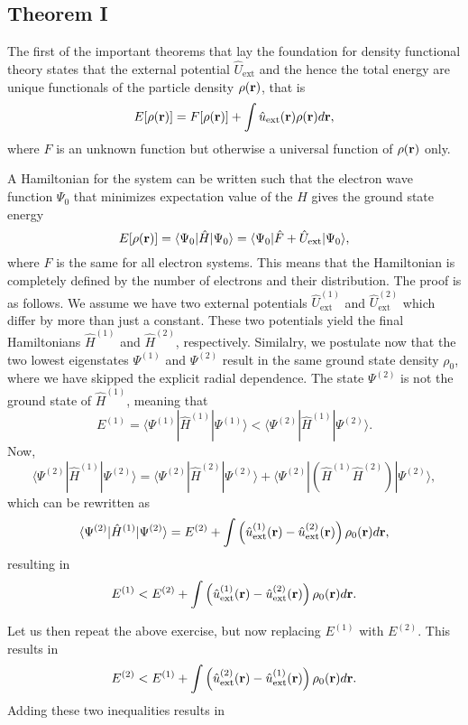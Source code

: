 \subsection{Theorem I}
The first of the important theorems that lay the foundation for density functional theory states that the external
potential $\hat{U}_{\mathrm{ext}}$ and the hence the total energy are unique functionals of the particle density
$\rho({\bf r})$, that is
\[
E[\rho({\bf r})]= F[\rho({\bf r})] +\int \hat{u}_{\mathrm{ext}}({\bf r})\rho({\bf r})d{\bf r},
\] 
where $F$ is an unknown function but otherwise a universal function of $\rho({\bf r})$ only. 

A Hamiltonian for the system can be written such that the electron wave function $\Psi_0$ that minimizes  expectation
value of the $\hat{H}$ gives the ground state energy
\[
E[\rho({\bf r})] = \langle \Psi_0 | \hat{H} |\Psi_0 \rangle=\langle \Psi_0 | \hat{F}+\hat{U}_{\mathrm{ext}} |\Psi_0 \rangle,
\]
where $F$ is the same for all electron systems. This means that the Hamiltonian is completely 
defined by the number of electrons and their distribution. The proof is as follows. We assume we have two
external potentials  $\hat{U}^{(1)}_{\mathrm{ext}}$ and $\hat{U}^{(2)}_{\mathrm{ext}}$ which differ by more than just a constant.
These two potentials yield the final Hamiltonians 
$\hat{H}^{(1)}$ and $\hat{H}^{(2)}$, respectively. Similalry, we postulate now that the two lowest eigenstates 
$\Psi^{(1)}$ and $\Psi^{(2)}$ result in the same ground state density $\rho_0$, where we have skipped the explicit radial
dependence. The state  $\Psi^{(2)}$ is not the ground state of 
$\hat{H}^{(1)}$, meaning that
\[
E^{(1)}=\langle \Psi^{(1)} | \hat{H}^{(1)} |\Psi^{(1)} \rangle <  \langle \Psi^{(2)} | \hat{H}^{(1)} |\Psi^{(2)} \rangle.
\]
Now, 
\[
\langle \Psi^{(2)} | \hat{H}^{(1)} |\Psi^{(2)} \rangle= \langle \Psi^{(2)} | \hat{H}^{(2)} |\Psi^{(2)} \rangle+\langle \Psi^{(2)} |(\hat{H}^{(1)} \hat{H}^{(2)}) |\Psi^{(2)} \rangle,
\]
which can be rewritten as
\[
\langle \Psi^{(2)} | \hat{H}^{(1)} |\Psi^{(2)} \rangle= E^{(2)}+\int \left(\hat{u}^{(1)}_{\mathrm{ext}}({\bf r})-\hat{u}^{(2)}_{\mathrm{ext}}({\bf r}) \right)
\rho_0({\bf r})d{\bf r},
\]
resulting in
\[
E^{(1)} < E^{(2)}+\int \left(\hat{u}^{(1)}_{\mathrm{ext}}({\bf r})-\hat{u}^{(2)}_{\mathrm{ext}}({\bf r}) \right)
\rho_0({\bf r})d{\bf r}.
\]

Let us then repeat the above exercise, but now replacing $E^{(1)}$ with $E^{(2)}$. This results in
\[
E^{(2)} < E^{(1)}+\int \left(\hat{u}^{(2)}_{\mathrm{ext}}({\bf r})-\hat{u}^{(1)}_{\mathrm{ext}}({\bf r}) \right)
\rho_0({\bf r})d{\bf r}.
\]
Adding these two inequalities results in 


